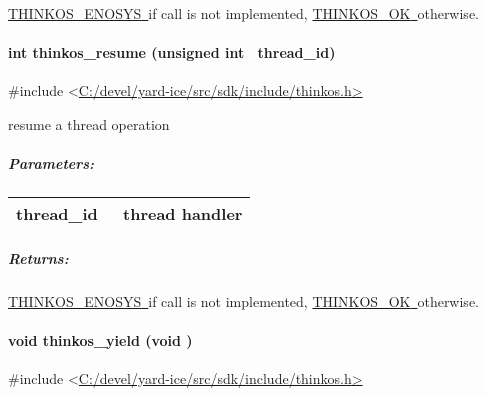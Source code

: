 {{\protect\hyperlink{h.3s49zyc}{THINKOS\_ENOSYS}}{\protect\hyperlink{h.3s49zyc}{~}}{if
call is not implemented,
}{\protect\hyperlink{h.2fk6b3p}{THINKOS\_OK}}{\protect\hyperlink{h.2fk6b3p}{~}}{otherwise.
}

\paragraph{\texorpdfstring{{int thinkos\_resume (unsigned int
~thread\_id)}}{int thinkos\_resume (unsigned int ~thread\_id)}}\label{int-thinkos_resume-unsigned-int-thread_id}

{}

{\#include
\textless{}}{\protect\hyperlink{h.pkwqa1}{C:/devel/yard-ice/src/sdk/include/thinkos.h}}{\protect\hyperlink{h.pkwqa1}{\textgreater{}}}

{resume a thread operation }

{}

\subparagraph{\texorpdfstring{{Parameters:}}{Parameters:}}\label{parameters-6}

\protect\hypertarget{t.d782c80b316c585f37cfeff504ed527240d62369}{}{}\protect\hypertarget{t.6}{}{}

\begin{longtable}[]{@{}ll@{}}
\toprule
\begin{minipage}[t]{0.47\columnwidth}\raggedright\strut
{thread\_id}{~}\strut
\end{minipage} & \begin{minipage}[t]{0.47\columnwidth}\raggedright\strut
{thread handler }\strut
\end{minipage}\tabularnewline
\bottomrule
\end{longtable}

\subparagraph{\texorpdfstring{{Returns:}}{Returns:}}\label{returns-7}

{\protect\hyperlink{h.3s49zyc}{THINKOS\_ENOSYS}}{\protect\hyperlink{h.3s49zyc}{~}}{if
call is not implemented,
}{\protect\hyperlink{h.2fk6b3p}{THINKOS\_OK}}{\protect\hyperlink{h.2fk6b3p}{~}}{otherwise.
}

\paragraph{\texorpdfstring{{void thinkos\_yield (void
)}}{void thinkos\_yield (void )}}\label{void-thinkos_yield-void}

{}

{\#include
\textless{}}{\protect\hyperlink{h.pkwqa1}{C:/devel/yard-ice/src/sdk/include/thinkos.h}}{\protect\hyperlink{h.pkwqa1}{\textgreater{}}}

}
